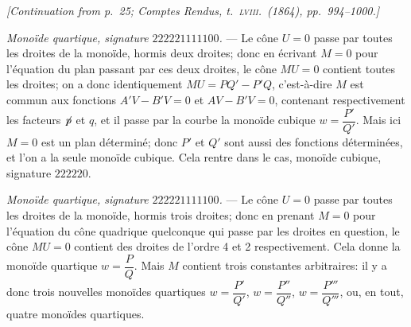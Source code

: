 \documentclass[11pt,a4paper]{article}
\begin{document}
\bigskip

\noindent\textit{[Continuation from p.\ 25; Comptes Rendus, t.\ \textsc{lviii}.\ (1864), pp.\ 994--1000.]}

\bigskip

\noindent[Discussion of the case where the cone $U=0$ passes through curves of orders 3 and 2 respectively, leading to the monoide cubique $w=\dfrac{P}{Q}$, of $P$, $Q$ containing one arbitrary constant. We write $M=K+sZ$, so taking $K=0$, $L=0$, for the curves of degrees passing through two adjacent points of each, one obtains identically $MU=PQ-P'Q'$, two monoides cubiques $w=\dfrac{P}{Q}$. Whence one passes to the curve of the monoide cubique, signature $222211$.]

\medskip

\noindent\textit{Mono\"{i}de quartique, signature $222221111100$.} --- Le c\^{o}ne $U=0$ passe par toutes les droites de la mono\"{i}de, hormis deux droites; donc en \'{e}crivant $M=0$ pour l'\'{e}quation du plan passant par ces deux droites, le c\^{o}ne $MU=0$ contient toutes les droites; on a donc identiquement $MU=PQ'-P'Q$, c'est-\`{a}-dire $M$ est commun aux fonctions $A'V-B'V=0$ et $AV-B'V=0$, contenant respectivement les facteurs $\not\!p$ et $q$, et il passe par la courbe la mono\"{i}de cubique $w=\dfrac{P'}{Q'}$. Mais ici $M=0$ est un plan d\'{e}termin\'{e}; donc $P'$ et $Q'$ sont aussi des fonctions d\'{e}termin\'{e}es, et l'on a la seule mono\"{i}de cubique. Cela rentre dans le cas, mono\"{i}de cubique, signature $222220$.

\medskip

\noindent\textit{Mono\"{i}de quartique, signature $222221111100$.} --- Le c\^{o}ne $U=0$ passe par toutes les droites de la mono\"{i}de, hormis trois droites; donc en prenant $M=0$ pour l'\'{e}quation du c\^{o}ne quadrique quelconque qui passe par les droites en question, le c\^{o}ne $MU=0$ contient des droites de l'ordre 4 et 2 respectivement. Cela donne la mono\"{i}de quartique $w=\dfrac{P}{Q}$. Mais $M$ contient trois constantes arbitraires: il y a donc trois nouvelles mono\"{i}des quartiques $w=\dfrac{P'}{Q'}$, $w=\dfrac{P''}{Q''}$, $w=\dfrac{P'''}{Q'''}$, ou, en tout, quatre mono\"{i}des quartiques.

\medskip
\end{document}
